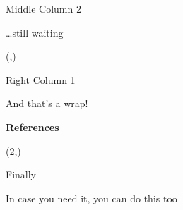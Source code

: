 \documentclass[final]{beamer}
\begin{document}
\begin{frame}[fragile]{}
\begin{textblock}{\mcolwidth}
\begin{paddedBlock}{Middle Column 2}

\ldots still waiting

\end{paddedBlock}


\end{textblock}


\begin{textblock}{\rcolwidth}(\thirdcolpos,\vstartCols)


\begin{paddedBlock}{Right Column 1}

And that's a wrap!

\end{paddedBlock}




\vspace{0.5cm}
\textbf{\normalsize References}

% 


\end{textblock}




\begin{textblock}{\fullwidth}(2,\bottomblockstart)
\begin{paddedBlock}[0.98\linewidth]{Finally}

In case you need it, you can do this too

\end{paddedBlock}
\end{textblock}

\end{frame}
\end{document}
